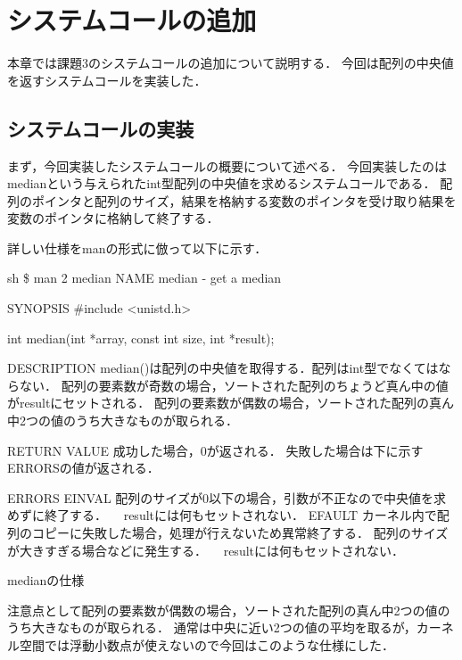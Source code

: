 \chapter{システムコールの追加}
本章では課題3のシステムコールの追加について説明する．
今回は配列の中央値を返すシステムコールを実装した．

\section{システムコールの実装}
まず，今回実装したシステムコールの概要について述べる．
今回実装したのはmedianという与えられたint型配列の中央値を求めるシステムコールである．
配列のポインタと配列のサイズ，結果を格納する変数のポインタを受け取り結果を変数のポインタに格納して終了する．

詳しい仕様をmanの形式に倣って以下に示す．
\begin{longlisting}
\begin{myminted}{sh}{}
\$ man 2 median
NAME
       median - get a median

SYNOPSIS
       \#include <unistd.h>

       int median(int *array, const int size, int *result);

DESCRIPTION
       median()は配列の中央値を取得する．配列はint型でなくてはならない．
       配列の要素数が奇数の場合，ソートされた配列のちょうど真ん中の値がresultにセットされる．
       配列の要素数が偶数の場合，ソートされた配列の真ん中2つの値のうち大きなものが取られる．

RETURN VALUE
       成功した場合，0が返される．
       失敗した場合は下に示すERRORSの値が返される．

ERRORS
       EINVAL 配列のサイズが0以下の場合，引数が不正なので中央値を求めずに終了する．
            　resultには何もセットされない．
       EFAULT カーネル内で配列のコピーに失敗した場合，処理が行えないため異常終了する．
              配列のサイズが大きすぎる場合などに発生する．
            　resultには何もセットされない．
\end{myminted}
\caption{medianの仕様}
\label{lst:syscallspec}
\end{longlisting}

注意点として配列の要素数が偶数の場合，ソートされた配列の真ん中2つの値のうち大きなものが取られる．
通常は中央に近い2つの値の平均を取るが，カーネル空間では浮動小数点が使えないので今回はこのような仕様にした．

